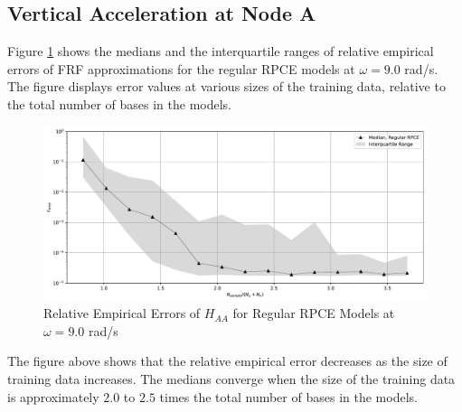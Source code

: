 %
%

\subsection{Vertical Acceleration at Node A}
\label{ssec: surrogate point A}

Figure \ref{FRF_rRPCE_A_A_2} shows the medians and the interquartile ranges of relative empirical errors of FRF approximations for the regular RPCE models at $\omega=9.0$ rad/s.
The figure displays error values at various sizes of the training data, relative to the total number of bases in the models.
\begin{figure}[H]
    \centering
    \includegraphics[width=1.0\textwidth]{
        plots/surrogate/plot_1P_A_2.pdf
    }
    \caption{%
        Relative Empirical Errors of $H_{AA}$ for Regular RPCE Models at $\omega=9.0$ rad/s
    }
    \label{FRF_rRPCE_A_A_2}
\end{figure}
The figure above shows that the relative empirical error decreases as the size of training data increases.
The medians converge when the size of the training data is approximately $2.0$ to $2.5$ times the total number of bases in the models.

